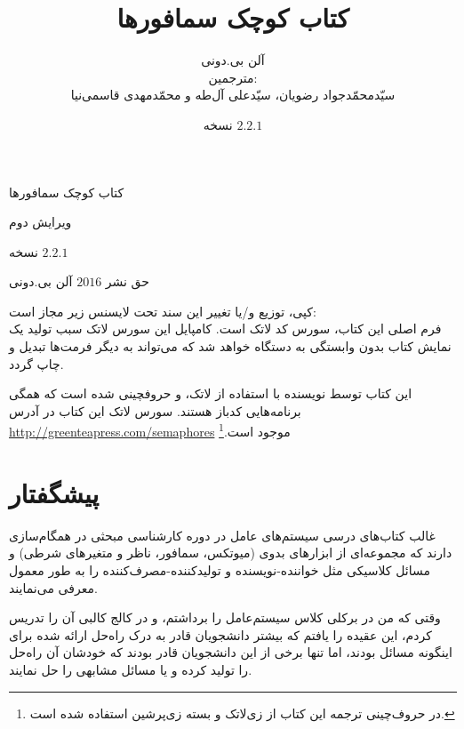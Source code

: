 \documentclass{book}
\title{کتاب کوچک سمافورها}
\author{آلن بی.دونی\\[2cm]
مترجمین:\\
سیّدمحمّدجواد رضویان، سیّدعلی آل‌طه و محمّدمهدی قاسمی‌نیا}
\newcommand{\theversion}{نسخه $2.2.1$}
\begin{document}

\date {\theversion}
\maketitle

\vspace{2in}
\begin{center}
{\Large کتاب کوچک سمافورها}

ویرایش دوم
\vspace{0.25in}

\theversion
\vspace{0.25in}

حق نشر $2016$ آلن بی.دونی
\end{center}
\vspace{0.25in}

کپی، توزیع و/یا تغییر این سند تحت لایسنس زیر مجاز است:\\
فرم اصلی این کتاب، سورس کد لاتک است. کامپایل این سورس لاتک سبب تولید یک نمایش کتاب بدون وابستگی به دستگاه خواهد شد 
که می‌تواند به دیگر فرمت‌ها تبدیل و چاپ گردد. 

این کتاب توسط نویسنده با استفاده از لاتک،  و  حروفچینی شده است که همگی برنامه‌هایی کدباز هستند.
سورس لاتک این کتاب در آدرس \url{http://greenteapress.com/semaphores} موجود است.\footnote{%
در حروف‌چینی ترجمه این کتاب از زی‌لاتک و بسته زی‌پرشین استفاده شده است.}


\frontmatter

\chapter{پیشگفتار}

غالب کتاب‌های درسی سیستم‌های عامل در دوره کارشناسی مبحثی در همگا‌م‌سازی دارند که مجموعه‌ای از  ابزارهای بدوی
(میوتکس، سمافور، ناظر و متغیر‌های شرطی) و مسائل کلاسیکی مثل خواننده-نویسنده و تولیدکننده-مصرف‌کننده را به طور معمول معرفی می‌نمایند. 

وقتی که من در برکلی کلاس سیستم‌عامل را برداشتم، و در کالج کالبی آن را تدریس کردم، 
این عقیده را یافتم که بیشتر دانشجویان قادر به درک راه‌حل ارائه شده برای اینگونه مسائل بودند، 
اما تنها برخی از این دانشجویان قادر بودند که خودشان آن راه‌حل را  تولید کرده و یا مسائل مشابهی را حل نمایند. 
\end{document}
